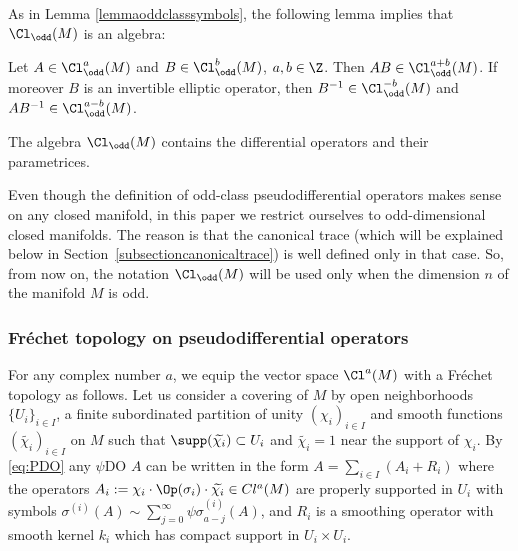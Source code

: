As in Lemma \ref{lemmaoddclasssymbols}, the following lemma implies that $\Cl_{\odd}(M)$ is an algebra:
\begin{lemma}\label{lema:oddClassproduct}
Let $A\in \Cl^{a}_{\odd}(M)$ and $B\in \Cl^{b}_{\odd}(M)$, $a,b\in\Z$. Then $AB\in \Cl^{a+b}_{\odd}(M)$. If moreover $B$ is an invertible elliptic operator, then $B^{-1}\in \Cl^{-b}_{\odd}(M)$ and $AB^{-1}\in \Cl^{a-b}_{\odd}(M)$.
\end{lemma}

The algebra $\Cl_{\odd}(M)$ contains the dif\/ferential operators and their parametrices.

\begin{remark}\label{remarknotationClodd}
Even though the def\/inition of odd-class pseudodif\/ferential operators makes sense on any closed manifold, in this paper we restrict ourselves to odd-dimensional closed manifolds. The reason is that the canonical trace (which will be explained below in Section~\ref{subsectioncanonicaltrace}) is well def\/ined only in that case. So, from now on, the notation $\Cl_{\odd}(M)$ will be used only when the dimension $n$ of the manifold $M$ is odd.
\end{remark}

\subsubsection{Fr\'echet topology on pseudodif\/ferential operators}\label{subsectionfrechettop}

For any complex number $a$,  we equip the vector space $\Cl^a(M)$ with a Fr\'echet topology as follows. Let us consider a covering of $M$ by open neighborhoods $\{U_i\}_{i\in I}$, a f\/inite subordinated partition of unity $(\chi_i)_{i\in I}$ and smooth functions $(\widetilde{\chi_i})_{i\in I}$ on $M$ such that $\supp(\widetilde{\chi_i})\subset U_i$ and $\widetilde{\chi_i}=1$ near the support of $\chi_i$. By \eqref{eq:PDO} any $\psi$DO $A$ can be written in the form $A=\sum\limits_{i\in I}(A_i+R_i)$ where the operators $A_i:=\chi_i\cdot\Op(\sigma_i)\cdot\widetilde{\chi_i}\in Cl^{a}(M)$ are properly supported in $U_i$ with symbols $\sigma^{(i)}(A)\sim\sum\limits_{j=0}^\infty\psi \sigma_{a-j}^{(i)}(A)$, and $R_i$ is a smoothing operator with smooth kernel $k_i$ which has compact support in $U_i\times U_i$.

